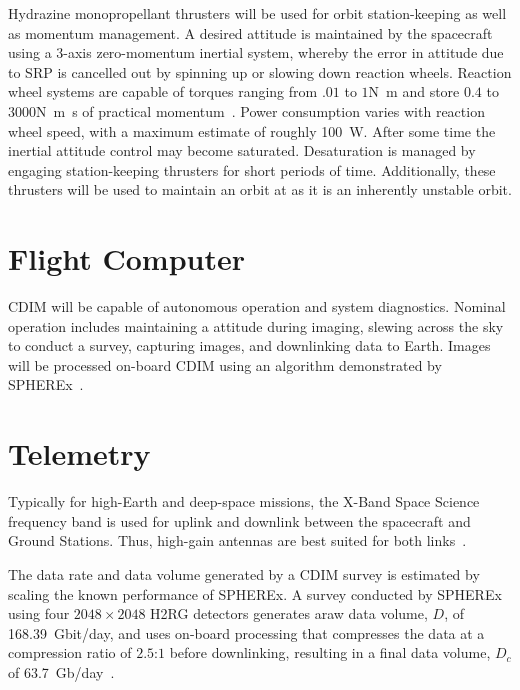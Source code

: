 \documentclass{ws-jai}
\begin{document}
Hydrazine monopropellant thrusters will be used for orbit station-keeping as well as momentum management.
A desired attitude is maintained by the spacecraft using a 3-axis zero-momentum inertial system, whereby the error in attitude due to SRP is cancelled out by spinning up or slowing down reaction wheels.
Reaction wheel systems are capable of torques ranging from $.01$ to $1$\si{\newton\meter} and store $0.4$ to $3000$\si{\newton\meter\second} of practical momentum~\cite{smad2015}.
Power consumption varies with reaction wheel speed, with a maximum estimate of roughly \SI{100}{\watt}.
After some time the inertial attitude control may become saturated.
Desaturation is managed by engaging station-keeping thrusters for short periods of time.
Additionally, these thrusters will be used to maintain an orbit at \Ltwo{} as it is an inherently unstable orbit.

\section{Flight Computer}
CDIM will be capable of autonomous operation and system diagnostics.
Nominal operation includes maintaining a attitude during imaging, slewing across the sky to conduct a survey, capturing images, and downlinking data to Earth.
Images will be processed on-board CDIM using an algorithm demonstrated by SPHEREx~\cite{spherexTelemetry2016}.

\section{Telemetry}
\label{sec:telemetry}
Typically for high-Earth and deep-space missions, the X-Band Space Science frequency band is used for uplink and downlink between the spacecraft and Ground Stations.
Thus, high-gain antennas are best suited for both links~\cite{smad2015}.

The data rate and data volume generated by a CDIM survey is estimated by scaling the known performance of SPHEREx.
A survey conducted by SPHEREx using four $2048\times2048$ H2RG detectors generates araw data volume, $D$, of \SI{168.39}{Gbit/day}, and uses on-board processing that compresses the data at a compression ratio of $2.5$:$1$ before downlinking, resulting in a final data volume, $D_c$ of \SI{63.7}{Gb/day}~\cite{spherexTelemetry2016}.
\end{document}
